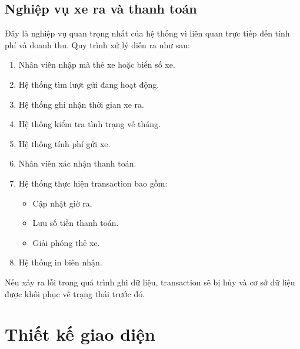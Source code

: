 
\subsection{Nghiệp vụ xe ra và thanh toán}

Đây là nghiệp vụ quan trọng nhất của hệ thống vì liên quan trực tiếp đến tính phí và doanh thu. Quy trình xử lý diễn ra như sau:

\begin{enumerate}
    \item Nhân viên nhập mã thẻ xe hoặc biển số xe.
    \item Hệ thống tìm lượt gửi đang hoạt động.
    \item Hệ thống ghi nhận thời gian xe ra.
    \item Hệ thống kiểm tra tình trạng vé tháng.
    \item Hệ thống tính phí gửi xe.
    \item Nhân viên xác nhận thanh toán.
    \item Hệ thống thực hiện transaction bao gồm:
    \begin{itemize}
        \item Cập nhật giờ ra.
        \item Lưu số tiền thanh toán.
        \item Giải phóng thẻ xe.
    \end{itemize}
    \item Hệ thống in biên nhận.
\end{enumerate}

Nếu xảy ra lỗi trong quá trình ghi dữ liệu, transaction sẽ bị hủy và cơ sở dữ liệu được khôi phục về trạng thái trước đó.


\section{Thiết kế giao diện}

